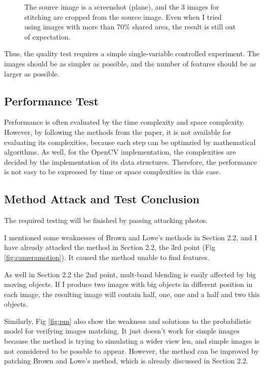 \documentclass[10pt,twocolumn,letterpaper]{article}
\begin{document}
\begin{figure}[t]
\begin{center}
    \end{center}
    \caption{The source image is a screenshot (plane), and the 3 images for stitching are cropped from the source image.
    Even when I tried using images with more than 70\% shared area, the result is still out of expectation.}
    \label{fig:fail}
\end{figure}

Thus, the quality test requires a simple single-variable controlled experiment.
The images should be as simpler as possible, and the number of features should be as larger as possible.

\subsection{Performance Test}
Performance is often evaluated by the time complexity and space complexity.
However, by following the methods from the paper, it is not available for evaluating its complexities,
because each step can be optimzied by mathematical algorithms. 
As well, for the OpenCV implementation, the complexities are decided by the implementation of its data structures.
Therefore, the performance is not easy to be expressed by time or space complexities in this case.

\subsection{Method Attack and Test Conclusion}
The required testing will be finished by passing attacking photos.

I mentioned some weaknesses of Brown and Lowe's methods in Section 2.2,
and I have already attacked the method in Section 2.2, the 3rd point (Fig \ref{fig:cameramotion}).
It caused the method unable to find features.

As well in Section 2.2 the 2nd point, mult-band blending is easily affected by big moving objects.
If I produce two images with big objects in different position in each image, the resulting image will contain half, one, one and a half and two this objects.

Similarly, Fig \ref{fig:pm} also show the weakness and solutions to the probabilistic model for verifying images matching.
It just doesn't work for simple images because the method is trying to simulating a wider view len, and simple images is not considered to be possble to appear.
However, the method can be improved by patching Brown and Lowe's method, which is already discussed in Section 2.2.
\end{document}
